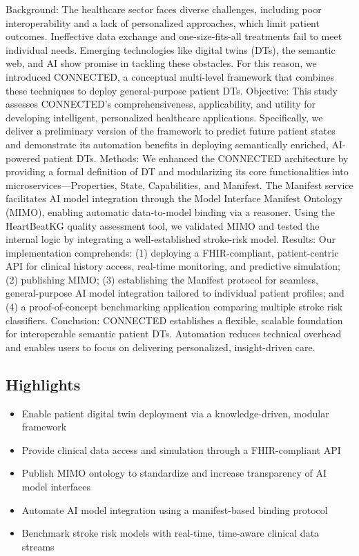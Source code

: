 \begin{paperabstract}

Background: The healthcare sector faces diverse challenges, including poor interoperability and a lack of personalized approaches, which limit patient outcomes. Ineffective data exchange and one-size-fits-all treatments fail to meet individual needs. Emerging technologies like digital twins (DTs), the semantic web, and AI show promise in tackling these obstacles. For this reason, we introduced CONNECTED, a conceptual multi-level framework that combines these techniques to deploy general-purpose patient DTs.
%
Objective: This study assesses CONNECTED's comprehensiveness, applicability, and utility for developing intelligent, personalized healthcare applications. Specifically, we deliver a preliminary version of the framework to predict future patient states and demonstrate its automation benefits in deploying semantically enriched, AI-powered patient DTs.
%
Methods: We enhanced the CONNECTED architecture by providing a formal definition of DT and modularizing its core functionalities into microservices—Properties, State, Capabilities, and Manifest. The Manifest service facilitates AI model integration through the Model Interface Manifest Ontology (MIMO), enabling automatic data-to-model binding via a reasoner. Using the HeartBeatKG quality assessment tool, we validated MIMO and tested the internal logic by integrating a well-established stroke-risk model.
%
Results: Our implementation comprehends: (1) deploying a FHIR-compliant, patient-centric API for clinical history access, real-time monitoring, and predictive simulation; (2) publishing MIMO; (3) establishing the Manifest protocol for seamless, general-purpose AI model integration tailored to individual patient profiles; and (4) a proof-of-concept benchmarking application comparing multiple stroke risk classifiers.
%
Conclusion: CONNECTED establishes a flexible, scalable foundation for interoperable semantic patient DTs. Automation reduces technical overhead and enables users to focus on delivering personalized, insight-driven care.
\end{paperabstract}

\subsection*{Highlights}

\begin{itemize}
\item Enable patient digital twin deployment via a knowledge-driven, modular framework
\item Provide clinical data access and simulation through a FHIR-compliant API
\item Publish MIMO ontology to standardize and increase transparency of AI model interfaces
\item Automate AI model integration using a manifest-based binding protocol
\item Benchmark stroke risk models with real-time, time-aware clinical data streams
\end{itemize}

